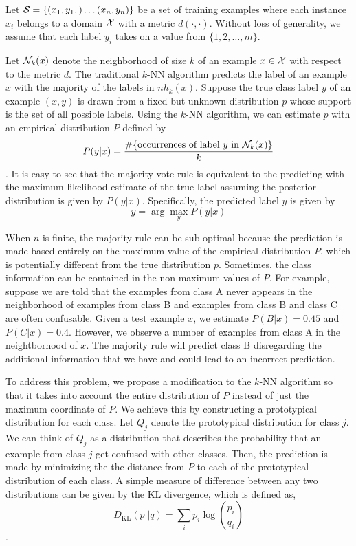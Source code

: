 \documentclass{article}
\begin{document}
Let $\S = \{ (x_1,y_1,) \ldots (x_n,y_n)\}$ be a set of training
examples where each instance $x_i$ belongs to a domain $\X$ with a
metric $d(\cdot,\cdot)$. Without loss of generality, we assume that
each label $y_i$ takes on a value from $\{1,2,\ldots,m\}$. 

Let $\nh_k(x)$ denote the neighborhood of size $k$ of an example $x
\in \X$ with respect to the metric $d$. The traditional $k$-NN
algorithm predicts the label of an example $x$ with the majority of
the labels in $nh_k(x)$. Suppose the true class label $y$ of an
example $(x,y)$ is drawn from a fixed but unknown distribution $p$
whose support is the set of all possible labels. Using the $k$-NN
algorithm, we can estimate $p$ with an empirical distribution $P$
defined by
\[
P(y|x) = \frac{\#\{ \mbox{occurrences of label } y \mbox{ in } \nh_k(x)\}}{k}
\].  It is easy to see that the majority vote rule is equivalent to
the predicting with the maximum likelihood estimate of the true label
assuming the posterior distribution is given by
$P(y|x)$. Specifically, the predicted label $\hat{y}$ is given by
\[
\hat{y} = \arg\max_y P(y|x)
\]

When $n$ is finite, the majority rule can be sub-optimal because the
prediction is made based entirely on the maximum value of the
empirical distribution $P$, which is potentially different from the
true distribution $p$. Sometimes, the class information can be
contained in the non-maximum values of $P$. For example, suppose we
are told that the examples from class A never appears in the
neighborhood of examples from class B and examples from class B and
class C are often confusable. Given a test example $x$, we estimate
$P(B | x) = 0.45$ and $P(C | x) = 0.4$. However, we observe a number
of examples from class A in the neightborhood of $x$. The majority
rule will predict class B disregarding the additional information that
we have and could lead to an incorrect prediction.

\newcommand{\dkl}{D_{\mathrm{KL}}}

To address this problem, we propose a modification to the $k$-NN
algorithm so that it takes into account the entire distribution of $P$
instead of just the maximum coordinate of $P$. We achieve this by
constructing a prototypical distribution for each class. Let $Q_j$
denote the prototypical distribution for class $j$. We can think of
$Q_j$ as a distribution that describes the probability that an example
from class $j$ get confused with other classes. Then, the prediction
is made by minimizing the the distance from $P$ to each of the
prototypical distribution of each class. A simple measure of
difference between any two distributions can be given by the KL
divergence, which is defined as,
\[
\dkl(p || q) = \sum_i p_i \log(\frac{p_i}{q_i})
\]. 
\end{document}
